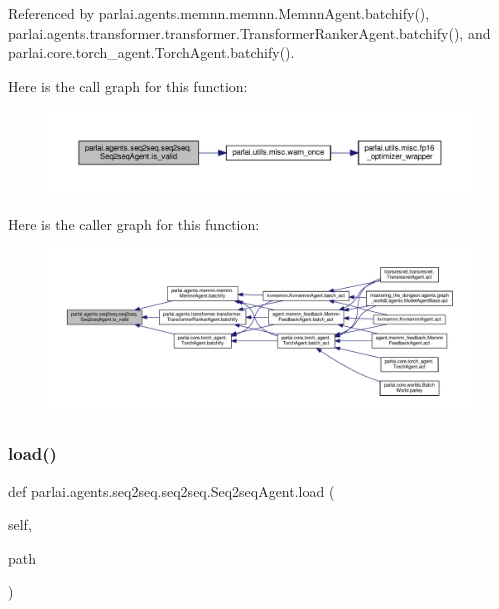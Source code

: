 Referenced by parlai.\+agents.\+memnn.\+memnn.\+Memnn\+Agent.\+batchify(), parlai.\+agents.\+transformer.\+transformer.\+Transformer\+Ranker\+Agent.\+batchify(), and parlai.\+core.\+torch\+\_\+agent.\+Torch\+Agent.\+batchify().

Here is the call graph for this function\+:
\nopagebreak
\begin{figure}[H]
\begin{center}
\leavevmode
\includegraphics[width=350pt]{classparlai_1_1agents_1_1seq2seq_1_1seq2seq_1_1Seq2seqAgent_a6fbfdde4ec69ec4050fa4005c6608f1a_cgraph}
\end{center}
\end{figure}
Here is the caller graph for this function\+:
\nopagebreak
\begin{figure}[H]
\begin{center}
\leavevmode
\includegraphics[width=350pt]{classparlai_1_1agents_1_1seq2seq_1_1seq2seq_1_1Seq2seqAgent_a6fbfdde4ec69ec4050fa4005c6608f1a_icgraph}
\end{center}
\end{figure}
\mbox{\label{classparlai_1_1agents_1_1seq2seq_1_1seq2seq_1_1Seq2seqAgent_a6f94b2896a2a76476f8646ec7d9360ed}} 
\subsubsection{\texorpdfstring{load()}{load()}}
{\footnotesize\ttfamily def parlai.\+agents.\+seq2seq.\+seq2seq.\+Seq2seq\+Agent.\+load (\begin{DoxyParamCaption}\item[{}]{self,  }\item[{}]{path }\end{DoxyParamCaption})}

